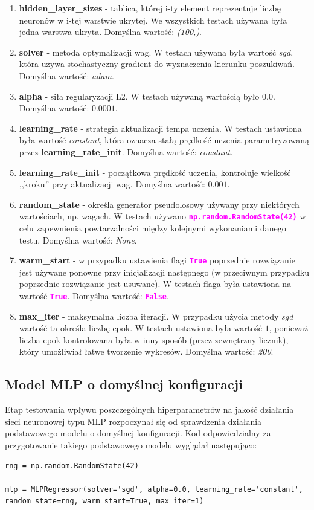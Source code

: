 \documentclass{article}
\newcommand{\code}[1]{\textcolor{Fuchsia}{\textbf{\texttt{#1}}}}
\begin{document}
    \begin{enumerate}
        \item \textbf{hidden\_layer\_sizes} - tablica, której i-ty element reprezentuje liczbę neuronów w i-tej warstwie ukrytej. We wszystkich testach używana była jedna warstwa ukryta. Domyślna wartość: \textit{(100,)}.
        \item \textbf{solver} - metoda optymalizacji wag. W testach używana była wartość \textit{sgd}, która używa stochastyczny gradient do wyznaczenia kierunku poszukiwań. Domyślna wartość: \textit{adam}.
        \item \textbf{alpha} - siła regularyzacji L2. W testach używaną wartością było $0.0$. Domyślna wartość: $0.0001$.
        \item \textbf{learning\_rate} - strategia aktualizacji tempa uczenia. W testach ustawiona była wartość \textit{constant}, która oznacza stałą prędkość uczenia parametryzowaną przez \textbf{learning\_rate\_init}. Domyślna wartość: \textit{constant}.
        \item \textbf{learning\_rate\_init} - początkowa prędkość uczenia, kontroluje wielkość ,,kroku'' przy aktualizacji wag. Domyślna wartość: $0.001$.
        \item \textbf{random\_state} - określa generator pseudolosowy używany przy niektórych wartościach, np. wagach. W testach używano \code{np.random.RandomState(42)} w celu zapewnienia powtarzalności między kolejnymi wykonaniami danego testu. Domyślna wartość: \textit{None}.
        \item \textbf{warm\_start} - w przypadku ustawienia flagi \code{True} poprzednie rozwiązanie jest używane ponowne przy inicjalizacji następnego (w przeciwnym przypadku poprzednie rozwiązanie jest usuwane). W testach flaga była ustawiona na wartość \code{True}. Domyślna wartość: \code{False}.
        \item \textbf{max\_iter} - maksymalna liczba iteracji. W przypadku użycia metody \textit{sgd} wartość ta określa liczbę epok. W testach ustawiona była wartość $1$, ponieważ liczba epok kontrolowana była w inny sposób (przez zewnętrzny licznik), który umożliwiał łatwe tworzenie wykresów. Domyślna wartość: \textit{200}.
    \end{enumerate}
    
    \subsection{Model MLP o domyślnej konfiguracji}
        Etap testowania wpływu poszczególnych hiperparametrów na jakość działania sieci neuronowej typu MLP rozpoczynał się od sprawdzenia działania podstawowego modelu o domyślnej konfiguracji. Kod odpowiedzialny za przygotowanie takiego podstawowego modelu wyglądał następująco:
\begin{lstlisting}
rng = np.random.RandomState(42)

mlp = MLPRegressor(solver='sgd', alpha=0.0, learning_rate='constant', random_state=rng, warm_start=True, max_iter=1)
\end{lstlisting}
\end{document}
